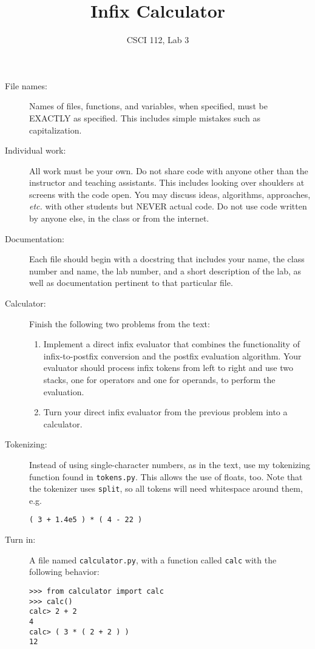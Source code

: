 \documentclass{article}
\title{Infix Calculator}
\author{CSCI 112, Lab 3}
\date{}
\begin{document}
\sloppy

\maketitle

\begin{description} 
\item[File names:]  Names of files, functions, and variables, 
when specified,
must be EXACTLY as specified.  This includes simple mistakes such
as capitalization.

\item[Individual work:]  All work must be your own.  Do not share
code with anyone other than the instructor and teaching assistants.
This includes looking over shoulders at screens with the code open.
You may discuss ideas, algorithms, approaches, {\em etc.} with
other students but NEVER actual code.  Do not use code
written by anyone else, in the class or from the internet.

\item[Documentation:] Each file should begin with a docstring
that includes your name, the class number and name, the lab
number, and  
a short description of the lab, as well as documentation pertinent
to that particular file.

\item[Calculator:] Finish the following two problems from the text:
\begin{enumerate}
\item
Implement a direct infix evaluator that combines the functionality of infix-to-postfix conversion and the postfix evaluation algorithm. Your evaluator should process infix tokens from left to right and use two stacks, one for operators and one for operands, to perform the evaluation.
\item
Turn your direct infix evaluator from the previous problem into a calculator.
\end{enumerate}

\item[Tokenizing:]  Instead of using single-character numbers, as in the text,
use my tokenizing function found in \lstinline{tokens.py}.  This allows the use
of floats, too.  Note that the tokenizer uses \lstinline{split}, so all tokens will need
whitespace around them, e.g.
\begin{lstlisting}
( 3 + 1.4e5 ) * ( 4 - 22 )
\end{lstlisting}

\item[Turn in:]  A file named \lstinline{calculator.py}, with a function
called \lstinline{calc} with the following behavior:
\begin{lstlisting}
>>> from calculator import calc
>>> calc()
calc> 2 + 2
4
calc> ( 3 * ( 2 + 2 ) )
12
\end{lstlisting}


\end{description}
\end{document}
